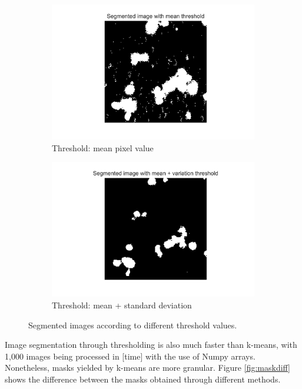 \begin{figure}[h]
    \centering
    \begin{subfigure}[h!]{0.4\textwidth}
        \includegraphics[width=\textwidth]{dissertation/figures/mean_threshold_cell.jpg}
        \caption{Threshold: mean pixel value}
        \label{fig:thresholdmean}
    \end{subfigure}
    \begin{subfigure}[h!]{0.4\textwidth}
        \includegraphics[width=\textwidth]{dissertation/figures/mean_std_threshold_cell.jpg}
        \caption{Threshold: mean + standard deviation}
        \label{fig:thresholdstd}
    \end{subfigure}
    \caption{Segmented images according to different threshold values.}
\end{figure}

Image segmentation through thresholding is also much faster than k-means, with 1,000 images being processed in [time] with the use of Numpy arrays. Nonetheless, masks yielded by k-means are more granular. Figure \ref{fig:maskdiff} shows the difference between the masks obtained through different methods.

